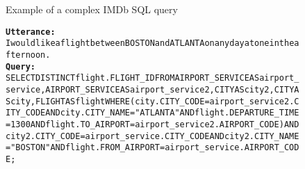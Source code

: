 \begin{figure}[H]
    \label{tab:IMDBsqlquery}
    \begin{AIbox}{Example of a complex IMDb SQL query}
        \vspace{-5px}
        \parbox{1\textwidth}{\scriptsize
        \begin{alltt} 
            {\bf Utterance:} \\ 
            I would like a flight between BOSTON and ATLANTA on any day at one in the afternoon. 
            \\
            {\bf Query:} \\
            SELECT DISTINCT flight.FLIGHT\_ID FROM AIRPORT\_SERVICE AS airport\_service , AIRPORT\_SERVICE AS airport\_service2 , CITY AS city2 , CITY AS city , FLIGHT AS flight WHERE ( city.CITY\_CODE = airport\_service2.CITY\_CODE AND city.CITY\_NAME = "ATLANTA" AND flight.DEPARTURE\_TIME = 1300 AND flight.TO\_AIRPORT = airport\_service2.AIRPORT\_CODE ) AND city2.CITY\_CODE = airport\_service.CITY\_CODE AND city2.CITY\_NAME = "BOSTON" AND flight.FROM\_AIRPORT = airport\_service.AIRPORT\_CODE ;
        \end{alltt}
        }
        \vspace{-5px}
    \end{AIbox}
\end{figure}